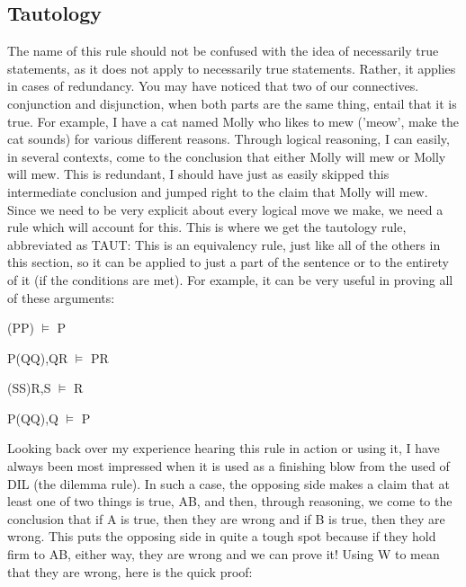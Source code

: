\demorgan

\subsection{Tautology}

The name of this rule should not be confused with the idea of necessarily true statements, as it does not apply to necessarily true statements. Rather, it applies in cases of redundancy. You may have noticed that two of our connectives. conjunction and disjunction, when both parts are the same thing, entail that it is true. For example, I have a cat named Molly who likes to mew ('meow', make the cat sounds) for various different reasons. Through logical reasoning, I can easily, in several contexts, come to the conclusion that either Molly will mew or Molly will mew. This is redundant, I should have just as easily skipped this intermediate conclusion and jumped right to the claim that Molly will mew. Since we need to be very explicit about every logical move we make, we need a rule which will account for this. This is where we get the tautology rule, abbreviated as TAUT:
This is an equivalency rule, just like all of the others in this section, so it can be applied to just a part of the sentence or to the entirety of it (if the conditions are met). For example, it can be very useful in proving all of these arguments:
\begin{earg}
\item[]\enot (\enot P\eif P) $\vDash$ \enot P
\item[]P\eif (Q\eand Q),Q\eif R $\vDash$ P\eif R
\item[](S\eor S)\eif R,S $\vDash$ R
\item[]P\eif \enot (Q\eand Q),Q $\vDash$ \enot P
\end{earg}
Looking back over my experience hearing this rule in action or using it, I have always been most impressed when it is used as a finishing blow from the used of DIL (the dilemma rule). In such a case, the opposing side makes a claim that at least one of two things is true, A\eor B, and then, through reasoning, we come to the conclusion that if A is true, then they are wrong and if B is true, then they are wrong. This puts the opposing side in quite a tough spot because if they hold firm to A\eor B, either way, they are wrong and we can prove it! Using W to mean that they are wrong, here is the quick proof:
\begin{fitchproof}
 	
 
\end{fitchproof}	

